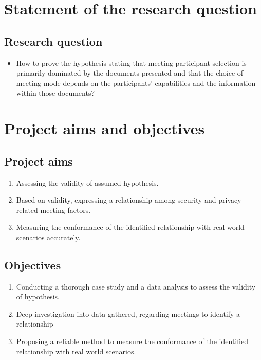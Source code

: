 \begin{spacing}{1.0}
    \section{Statement of the research question}

    \subsection{Research question}
    \begin{itemize}
        \item How to prove the hypothesis stating that meeting participant selection is primarily dominated by the documents presented and that the choice of meeting mode depends on the participants' capabilities and the information within those documents?
    \end{itemize}

    
    \section{Project aims and objectives}

    \subsection{Project aims}
    \begin{enumerate}
        \item Assessing the validity of assumed hypothesis.
        \item Based on validity, expressing a relationship among security and privacy-related meeting factors.
        \item Measuring the conformance of the identified relationship with real world scenarios accurately.
    \end{enumerate}

    \subsection{Objectives}
    \begin{enumerate}
        \item Conducting a thorough case study and a data analysis to assess the validity of hypothesis.
        \item Deep investigation into data gathered, regarding meetings to identify a relationship
        \item Proposing a reliable method to measure the conformance of the identified relationship with real world scenarios.
    \end{enumerate}


\end{spacing}
